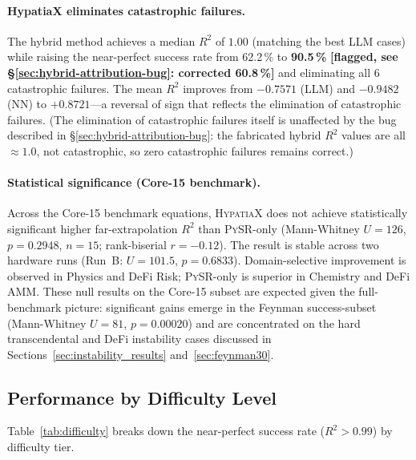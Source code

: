 \documentclass[twoside,11pt]{article}
\newcommand{\Rsq}{R^{2}}
\begin{document}
\paragraph{HypatiaX eliminates catastrophic failures.}
The hybrid method achieves a median $\Rsq$ of $1.00$ (matching the best LLM cases)
while raising the near-perfect success rate from 62.2\,\% to \textbf{90.5\,\%}
\textbf{[flagged, see \S\ref{sec:hybrid-attribution-bug}: corrected 60.8\,\%]}
and eliminating all 6 catastrophic failures.  The mean $\Rsq$ improves from
$-0.7571$ (LLM) and $-0.9482$ (NN) to $+0.8721$---a reversal of sign that reflects
the elimination of catastrophic failures. (The elimination of catastrophic
failures itself is unaffected by the bug described in
\S\ref{sec:hybrid-attribution-bug}: the fabricated hybrid $\Rsq$ values are all
$\approx 1.0$, not catastrophic, so zero catastrophic failures remains correct.)

\paragraph{Statistical significance (Core-15 benchmark).}
Across the Core-15 benchmark equations, \textsc{HypatiaX} does not achieve
statistically significant higher far-extrapolation $\Rsq$ than \textsc{PySR}-only
(Mann-Whitney $U=126$, $p=0.2948$, $n=15$; rank-biserial $r=-0.12$).  The result
is stable across two hardware runs (Run~B: $U=101.5$, $p=0.6833$).
Domain-selective improvement is observed in Physics and DeFi Risk;
\textsc{PySR}-only is superior in Chemistry and DeFi AMM.
These null results on the Core-15 subset are expected given the full-benchmark
picture: significant gains emerge in the Feynman success-subset
(Mann-Whitney $U=81$, $p=0.00020$) and are concentrated on the hard transcendental
and DeFi instability cases discussed in Sections~\ref{sec:instability_results}
and~\ref{sec:feynman30}.

\subsection{Performance by Difficulty Level}\label{subsec:performance-by-difficulty-level}
\label{sec:difficulty}

Table~\ref{tab:difficulty} breaks down the near-perfect success rate ($\Rsq > 0.99$)
by difficulty tier.
\end{document}
